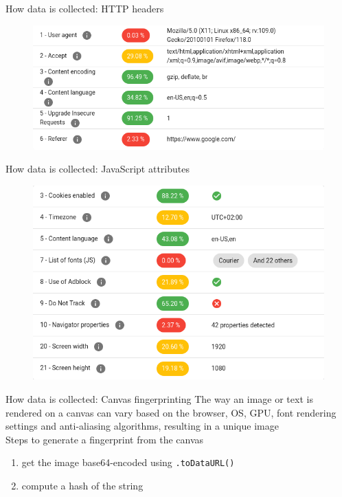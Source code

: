 \begin{frame}{How data is collected: HTTP headers}
  \begin{figure}
    \centering
    \includegraphics[width=\textwidth]{images/http-data.png}
  \end{figure}
\end{frame}

\begin{frame}{How data is collected: JavaScript attributes}
  \begin{figure}
    \centering
    \includegraphics[width=\textwidth]{images/js-data.png}
  \end{figure}
\end{frame}

\begin{frame}{How data is collected: Canvas fingerprinting}
  The way an image or text is rendered on a canvas can vary based on the browser, OS, GPU, font rendering settings and anti-aliasing algorithms, resulting in a unique image \\[1cm]
  \noindent Steps to generate a fingerprint from the canvas
  \vspace{0.5cm}
  \begin{enumerate}
    \item get the image base64-encoded using \texttt{.toDataURL()}
          \vspace{0.5cm}
    \item compute a hash of the string
  \end{enumerate}
\end{frame}


